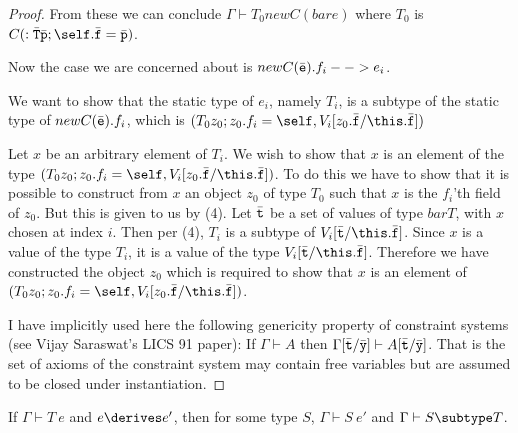 \begin{proof}
From these we can conclude
   $\Gamma \vdash T_0 new C(bar e)$
where $T_0$ is $C(: \bar{\tt T} \bar{\tt p}; \self.\bar{\tt f} = \bar{\tt p})$.

Now the case we are concerned about is $new C(\bar{\tt e}).f_i --> e_i$.

We want to show that the static type of $e_i$, namely $T_i$, 
is a subtype of the static
type of $new C(\bar{\tt e}).f_i$, which is
$(T_0 z_0; z_0.f_i=\self, V_i[z_0.\bar{\tt f}/\this.\bar{\tt f}])$

Let $x$ be an arbitrary element of $T_i$. 
We wish to show that $x$ is an element of
the type $(T_0 z_0; z_0.f_i=\self, V_i[z_0.\bar{\tt f}/\this.\bar{\tt f}])$.
To do this we have
to show that it is possible to construct from $x$ an object $z_0$ of type 
$T_0$ such
that $x$ is the $f_i$'th field of $z_0$. But this is given to us by (4).
Let $\bar{\tt t}$ be
a set of values of type $bar T$, with $x$ chosen at index $i$.
Then per (4), $T_i$ is a
subtype of $V_i[\bar{\tt t}/\this.\bar{\tt f}]$. Since $x$ is a value of the type $T_i$, 
it is a value of the type $V_i[\bar{\tt t}/\this.\bar{\tt f}]$. 
Therefore we have constructed the object $z_0$ 
which is required to show that $x$ is an element of 
$(T_0 z_0; z_0.f_i=\self, V_i[z_0.\bar{\tt f}/\this.\bar{\tt f}])$.

I have implicitly used here the following genericity property of constraint
systems (see Vijay Saraswat's LICS 91 paper):
If $\Gamma \vdash A$ then $\Gamma[\bar{\tt t}/\bar{\tt y}] \vdash A [\bar{\tt t}/\bar{\tt y}]$.
That is the set of axioms of the constraint system may contain free
variables but are assumed to be closed under instantiation.
\end{proof}


\begin{theorem} 
\label{preservation}
If $\Gamma \vdash T\ e$ and $e \derives e'$, then for some type $S$,
$\Gamma \vdash S\ e'$ and $\Gamma \vdash S \subtype T$.
\end{theorem}

